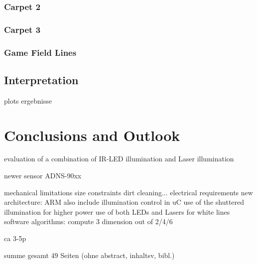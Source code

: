 \documentclass[12pt,a4paper]{article}
\begin{document}
\subsubsection{Carpet 2}

\subsubsection{Carpet 3}

\subsubsection{Game Field Lines}

\subsection{Interpretation}

  plots
  ergebnisse

\clearpage
\section{Conclusions and Outlook}

  evaluation of a combination of IR-LED illumination and Laser illumination

  newer sensor ADNS-90xx

  mechanical limitations
    size constraints
    dirt cleaning...
  electrical requirements
    new architecture: ARM
    also include illumination control in uC
      use of the shuttered illumination for higher power 
      use of both LEDs and Lasers for white lines
  software algorithms: compute 3 dimension out of 2/4/6

ca 3-5p


summe gesamt 49 Seiten (ohne abstract, inhaltsv, bibl.)


\clearpage
{}
\label{Bibliography}


%
\end{document}
